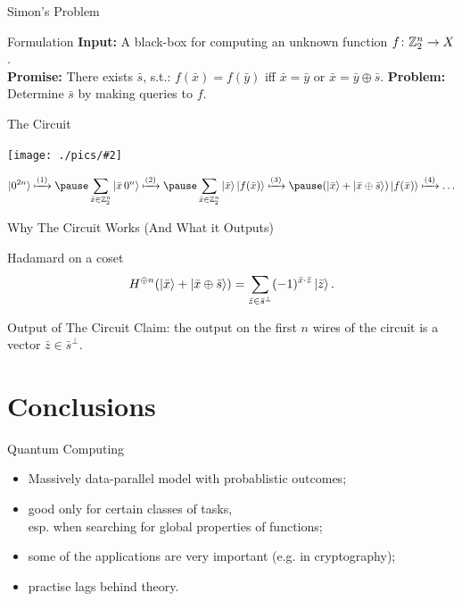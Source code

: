 \documentclass[
handout,
ignorenonframetext,hyperref={pdftex,unicode},xcolor=dvipsnames]{beamer}
\newcommand{\screenshotw}[2]{
\begin{center} 
\texttt{[image: ./pics/\#2]}
\end{center}
}
\begin{document}
\begin{frame}{Simon's Problem}

  \begin{block}{Formulation}
  \textbf{Input:} A black-box for computing an unknown function $f\colon \mathbb Z^n_2 \to X$.\\
  \textbf{Promise:} There exists $\bar s$, s.t.: $f(\bar x) = f(\bar y)$ iff $\bar x = \bar y$
  or $\bar x = \bar y \oplus \bar s$.
  \textbf{Problem:} Determine $\bar s$ by making queries to $f$.
  \end{block}

  \pause
  \begin{block}{The Circuit}
  \screenshotw{9cm}{simon.pdf}
  
  \pause
  \vspace{-1cm}
  \[
      \ket {0^{2n}} 
        \xmapsto{(1)} \pause
          \sum_{\bar x \in \Z^n_2} \ket {\bar x \,0^n}
        \xmapsto{(2)} \pause
          \sum_{\bar x \in \Z^n_2} 
            \ket {\bar x} \ket{f(\bar x)}
        \xmapsto{(3)} \pause %
          (\ket {\bar x} + \ket {\bar x \oplus \bar s}) \ket{f(\bar x)}
        \xmapsto{(4)} \ldots
  \]
  \end{block}

\end{frame}


\begin{frame}{Why The Circuit Works (And What it Outputs)}

  \begin{block}{Hadamard on a coset}
  \[
    H^{\oplus n}(\ket{\bar x} + \ket{\bar x \oplus \bar s}  ) =
      \sum_{\bar z \in {\bar s}^\perp} (-1)^{\bar x \cdot \bar z} \ket{\bar z}.
  \]
  \end{block}

  \pause
  \begin{block}{Output of The Circuit}
  Claim: the output on the first $n$ wires of the circuit is a vector $\bar z \in {\bar s}^\perp$.
  \end{block}
  
\end{frame}

\section{Conclusions}

\begin{frame}{Quantum Computing}

\begin{itemize}[<+->]
\item Massively data-parallel model with probablistic outcomes;
\item good only for certain classes of tasks,\\
      esp. when searching for global properties of functions;
\item some of the applications are very important (e.g. in cryptography);
\item practise lags behind theory.
\end{itemize}

\end{frame}
\end{document}
